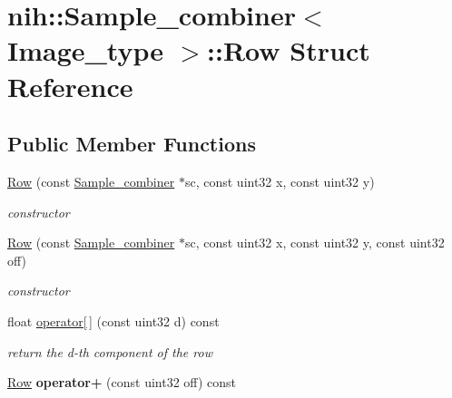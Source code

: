 \hypertarget{structnih_1_1_sample__combiner_1_1_row}{
\section{nih\-:\-:\-Sample\-\_\-combiner$<$ \-Image\-\_\-type $>$\-:\-:\-Row \-Struct \-Reference}
\label{structnih_1_1_sample__combiner_1_1_row}
}
\subsection*{\-Public \-Member \-Functions}
\begin{DoxyCompactItemize}
\item 
\hypertarget{structnih_1_1_sample__combiner_1_1_row_a80c38a578ae1a9e15c545258ea7d6773}{
\hyperlink{structnih_1_1_sample__combiner_1_1_row_a80c38a578ae1a9e15c545258ea7d6773}{\-Row} (const \hyperlink{classnih_1_1_sample__combiner}{\-Sample\-\_\-combiner} $\ast$sc, const uint32 x, const uint32 y)}
\label{structnih_1_1_sample__combiner_1_1_row_a80c38a578ae1a9e15c545258ea7d6773}

\begin{DoxyCompactList}\small\item\em constructor \end{DoxyCompactList}\item 
\hypertarget{structnih_1_1_sample__combiner_1_1_row_a55ad121165bdfda2b5ea9245065602c1}{
\hyperlink{structnih_1_1_sample__combiner_1_1_row_a55ad121165bdfda2b5ea9245065602c1}{\-Row} (const \hyperlink{classnih_1_1_sample__combiner}{\-Sample\-\_\-combiner} $\ast$sc, const uint32 x, const uint32 y, const uint32 off)}
\label{structnih_1_1_sample__combiner_1_1_row_a55ad121165bdfda2b5ea9245065602c1}

\begin{DoxyCompactList}\small\item\em constructor \end{DoxyCompactList}\item 
\hypertarget{structnih_1_1_sample__combiner_1_1_row_a8833bfd54782632fa16ce52ccb2867c5}{
float \hyperlink{structnih_1_1_sample__combiner_1_1_row_a8833bfd54782632fa16ce52ccb2867c5}{operator\mbox{[}$\,$\mbox{]}} (const uint32 d) const }
\label{structnih_1_1_sample__combiner_1_1_row_a8833bfd54782632fa16ce52ccb2867c5}

\begin{DoxyCompactList}\small\item\em return the d-\/th component of the row \end{DoxyCompactList}\item 
\hypertarget{structnih_1_1_sample__combiner_1_1_row_a3b80a0609320315ac0a9ec24d81f13d1}{
\hyperlink{structnih_1_1_sample__combiner_1_1_row}{\-Row} {\bfseries operator+} (const uint32 off) const }
\label{structnih_1_1_sample__combiner_1_1_row_a3b80a0609320315ac0a9ec24d81f13d1}

\end{DoxyCompactItemize}
